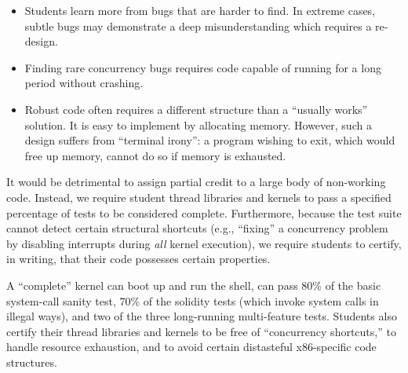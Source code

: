 \begin{itemize}
	\item Students learn more from bugs
		that are harder to find.
		In extreme cases, %
		subtle bugs may
		demonstrate a deep misunderstanding which requires a re-design.

	\item %
		Finding rare concurrency bugs requires code capable of running
		for a long period without crashing.

	\item Robust code often requires a different structure
		than a ``usually works'' solution.
		It is easy to %
		implement  by
		allocating memory. %
		However, such a design suffers from ``terminal irony'':
		a program wishing to exit,
		which would free up memory,
		cannot do so if memory is exhausted.
\end{itemize}

It would be detrimental to
assign partial credit to a large body of non-working
code.
Instead, we require student thread libraries and kernels to pass a
specified percentage of tests
to be considered complete.
Furthermore,
because the test suite cannot detect certain
structural shortcuts (e.g., ``fixing'' a concurrency
problem by disabling interrupts during \textit{all}
kernel execution),
we require students to certify, in writing, that
their code possesses certain properties.


A ``complete'' kernel can boot up and run the shell,
can pass 80\% of the basic system-call sanity test,
70\% of the solidity tests (which
invoke system calls in illegal
ways),
and two of the three long-running multi-feature tests.
Students also certify their thread libraries and kernels to
be free of ``concurrency shortcuts,''
to handle resource exhaustion,
and to avoid certain distasteful x86-specific code structures.

